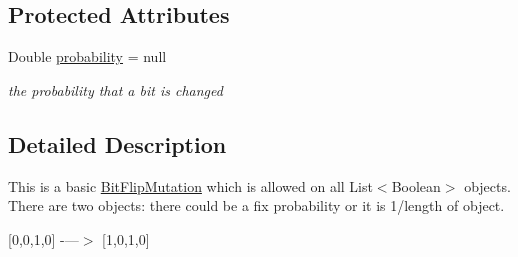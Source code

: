 \subsection*{Protected Attributes}
\begin{DoxyCompactItemize}
\item 
\hypertarget{classcom_1_1msu_1_1moo_1_1operators_1_1mutation_1_1RestrictedPolynomialMutation_a1f8ad0e089b42b3641b6e79ae6a5fcba}{Double \hyperlink{classcom_1_1msu_1_1moo_1_1operators_1_1mutation_1_1RestrictedPolynomialMutation_a1f8ad0e089b42b3641b6e79ae6a5fcba}{probability} = null}\label{classcom_1_1msu_1_1moo_1_1operators_1_1mutation_1_1RestrictedPolynomialMutation_a1f8ad0e089b42b3641b6e79ae6a5fcba}

\begin{DoxyCompactList}\small\item\em the probability that a bit is changed \end{DoxyCompactList}\end{DoxyCompactItemize}


\subsection{Detailed Description}
This is a basic \hyperlink{classcom_1_1msu_1_1moo_1_1operators_1_1mutation_1_1BitFlipMutation}{Bit\-Flip\-Mutation} which is allowed on all List$<$\-Boolean$>$ objects. There are two objects\-: there could be a fix probability or it is 1/length of object.

\mbox{[}0,0,1,0\mbox{]} -\/---$>$ \mbox{[}1,0,1,0\mbox{]} 

